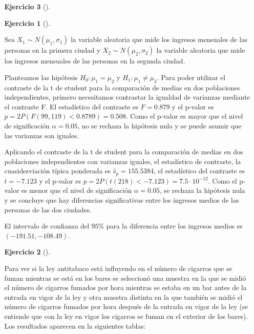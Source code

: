 \documentclass[
  a4paper,
]{scrreport}
\theoremstyle{definition}
\newtheorem{exercise}{Ejercicio}[chapter]
\theoremstyle{remark}
\begin{document}
\begin{exercise}[]
\begin{exercise}[]
\end{exercise}

\begin{tcolorbox}[enhanced jigsaw, colbacktitle=quarto-callout-tip-color!10!white, bottomrule=.15mm, bottomtitle=1mm, rightrule=.15mm, colback=white, left=2mm, opacityback=0, title=\textcolor{quarto-callout-tip-color}{\faLightbulb}\hspace{0.5em}{Solución}, leftrule=.75mm, arc=.35mm, titlerule=0mm, coltitle=black, opacitybacktitle=0.6, colframe=quarto-callout-tip-color-frame, breakable, toprule=.15mm, toptitle=1mm]

Sea \(X_1\sim N(\mu_1, \sigma_1)\) la variable aleatoria que mide los
ingresos mensuales de las personas en la primera ciudad y
\(X_2\sim N(\mu_2, \sigma_2)\) la variable aleatoria que mide los
ingresos mensuales de las personas en la segunda ciudad.

Planteamos las hipótesis \(H_0: \mu_1=\mu_2\) y
\(H_1: \mu_1\neq \mu_2\). Para poder utilizar el contraste de la t de
student para la comparación de medias en dos poblaciones independientes,
primero necesitamos contrastar la igualdad de varianzas mediante el
contraste F. El estadístico del contraste es \(F=0.879\) y el p-valor es
\(p =2 P(F(99,119)<0.8789) = 0.508\). Como el p-valor es mayor que el
nivel de significación \(\alpha = 0.05\), no se rechaza la hipótesis
nula y se puede asumir que las varianzas son iguales.

Aplicando el contraste de la t de student para la comparación de medias
en dos poblaciones independientes con varianzas iguales, el estadístico
de contraste, la cuasidesviación típica ponderada es
\(\hat s_p = 155.5384\), el estadístico del contraste es \(t= -7.123\) y
el p-valor es \(p =2 P(t(218)<-7.123) = 7.5\cdot 10^{-12}\). Como el
p-valor es menor que el nivel de significación \(\alpha = 0.05\), se
rechaza la hipótesis nula y se concluye que hay diferencias
significativas entre los ingresos medios de las personas de las dos
ciudades.

El intervalo de confianza del \(95\)\% para la diferencia entre los
ingresos medios es \((-191.51, -108.49)\).

\end{tcolorbox}

\begin{exercise}[]\protect\hypertarget{exr-contraste-medias-cigarros}{}\label{exr-contraste-medias-cigarros}

Para ver si la ley antitabaco está influyendo en el número de cigarros
que se fuman mientras se está en los bares se seleccionó una muestra en
la que se midió el número de cigarros fumados por hora mientras se
estaba en un bar antes de la entrada en vigor de la ley y otra muestra
distinta en la que también se midió el número de cigarros fumados por
hora después de la entrada en vigor de la ley (se entiende que con la
ley en vigor los cigarros se fuman en el exterior de los bares). Los
resultados aparecen en la siguientes tablas:


\end{exercise}
\end{exercise}
\end{document}

